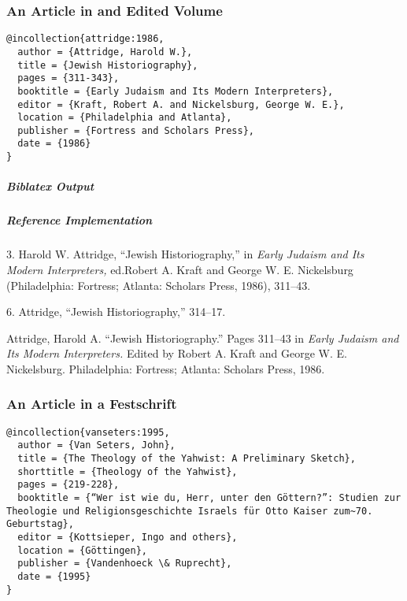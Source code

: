 \documentclass[a4paper]{article}
\newenvironment{biboutput}{%
  \subparagraph{Biblatex Output}
}{\color{black}}
\newenvironment{refimp}{%
  \subparagraph{Reference Implementation}
  \color{reference-colour}
  \rm
}{\par\color{black}}
\begin{document}
\subsubsection{An Article in and Edited Volume}

\begin{lstlisting}
@incollection{attridge:1986,
  author = {Attridge, Harold W.},
  title = {Jewish Historiography},
  pages = {311-343},
  booktitle = {Early Judaism and Its Modern Interpreters},
  editor = {Kraft, Robert A. and Nickelsburg, George W. E.},
  location = {Philadelphia and Atlanta},
  publisher = {Fortress and Scholars Press},
  date = {1986}
}
\end{lstlisting}  

\begin{biboutput}
\end{biboutput}

\begin{refimp}
  \hspace*{\bibindent}3. Harold W. Attridge, “Jewish Historiography,” in
  \emph{Early Judaism and Its Modern Interpreters,} ed.\@ Robert A. Kraft and
  George W. E. Nickelsburg (Philadelphia: Fortress; Atlanta: Scholars Press,
  1986), 311–43.
  
  \hspace*{\bibindent}6. Attridge, “Jewish Historiography,” 314–17.

  Attridge, Harold A. “Jewish Historiography.” Pages 311–43 in \emph{Early
  Judaism and Its Modern Interpreters.} Edited by Robert A. Kraft and George
  W. E. Nickelsburg. Philadelphia: Fortress; Atlanta: Scholars Press, 1986.
\end{refimp}

\subsubsection{An Article in a Festschrift}

\begin{lstlisting}
@incollection{vanseters:1995,
  author = {Van Seters, John},
  title = {The Theology of the Yahwist: A Preliminary Sketch},
  shorttitle = {Theology of the Yahwist},
  pages = {219-228},
  booktitle = {“Wer ist wie du, Herr, unter den Göttern?”: Studien zur Theologie und Religionsgeschichte Israels für Otto Kaiser zum~70. Geburtstag},
  editor = {Kottsieper, Ingo and others},
  location = {Göttingen},
  publisher = {Vandenhoeck \& Ruprecht},
  date = {1995}
}
\end{lstlisting}  
\end{document}
